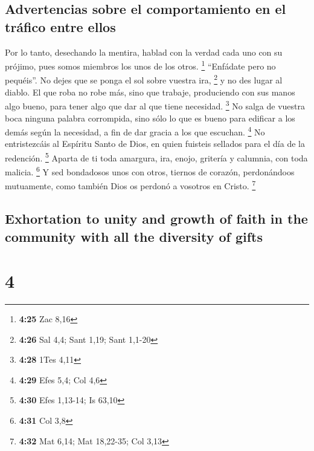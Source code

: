 \begin{paracol}{2}
\hypertarget{advertencias-sobre-el-comportamiento-en-el-truxe1fico-entre-ellos}{%
\subsection{Advertencias sobre el comportamiento en el tráfico entre
ellos}\label{advertencias-sobre-el-comportamiento-en-el-truxe1fico-entre-ellos}}

 Por lo tanto, desechando la mentira, hablad con la
verdad cada uno con su prójimo, pues somos miembros los unos de los
otros. \footnote{\textbf{4:25} Zac 8,16}  ``Enfádate pero
no pequéis''. No dejes que se ponga el sol sobre vuestra ira,
\footnote{\textbf{4:26} Sal 4,4; Sant 1,19; Sant 1,1-20} 
y no des lugar al diablo.  El que roba no robe más, sino
que trabaje, produciendo con sus manos algo bueno, para tener algo que
dar al que tiene necesidad. \footnote{\textbf{4:28} 1Tes 4,11}
 No salga de vuestra boca ninguna palabra corrompida,
sino sólo lo que es bueno para edificar a los demás según la necesidad,
a fin de dar gracia a los que escuchan. \footnote{\textbf{4:29} Efes
  5,4; Col 4,6}  No entristezcáis al Espíritu Santo de
Dios, en quien fuisteis sellados para el día de la redención.
\footnote{\textbf{4:30} Efes 1,13-14; Is 63,10}  Aparta
de ti toda amargura, ira, enojo, gritería y calumnia, con toda malicia.
\footnote{\textbf{4:31} Col 3,8}  Y sed bondadosos unos
con otros, tiernos de corazón, perdonándoos mutuamente, como también
Dios os perdonó a vosotros en Cristo. \footnote{\textbf{4:32} Mat 6,14;
  Mat 18,22-35; Col 3,13}

\switchcolumn
\begin{otherlanguage}{english}

\hypertarget{exhortation-to-unity-and-growth-of-faith-in-the-community-with-all-the-diversity-of-gifts}{%
\subsection{Exhortation to unity and growth of faith in the community
with all the diversity of
gifts}\label{exhortation-to-unity-and-growth-of-faith-in-the-community-with-all-the-diversity-of-gifts}}

\hypertarget{section-7}{%
\section{4}\label{section-7}}


\end{otherlanguage}
\end{paracol}
